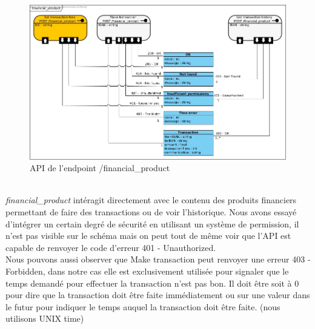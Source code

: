 \documentclass[../rapport.tex]{subfiles}
\begin{document}
\begin{figure}[H]
    \includegraphics[scale=0.44]{ressources/photos_diagrammes/API/financial_product.jpg}
    \caption{API de l'endpoint /financial\_product}
\end{figure}
\textit{\\financial\_product} intéragit directement avec le contenu des produits financiers permettant de faire des transactions ou de voir l'historique. Nous avons essayé d'intégrer un certain degré de sécurité en utilisant un système de permission, il n'est pas visible sur le schéma mais on peut tout de même voir que l'API est capable de renvoyer le code d'erreur 401 - Unauthorized. \\
Nous pouvons aussi observer que Make transaction peut renvoyer une erreur 403 - Forbidden, dans notre cas elle est exclusivement utilisée pour signaler que le temps demandé pour effectuer la transaction n'est pas bon. Il doit être soit à 0 pour dire que la transaction doit être faite immédiatement ou sur une valeur dans le futur pour indiquer le temps auquel la transaction doit être faite. (nous utilisons UNIX time)

\newpage
\end{document}
